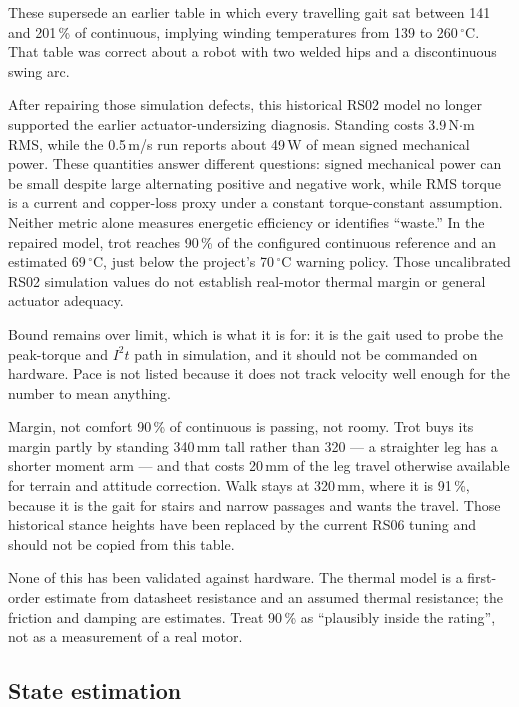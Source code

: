 \documentclass[11pt,a4paper]{article}
\begin{document}
These supersede an earlier table in which every travelling gait sat between 141
and 201\,\% of continuous, implying winding temperatures from 139 to
260\,$^\circ$C. That table was correct about a robot with two welded hips and a
discontinuous swing arc.

After repairing those simulation defects, this historical RS02 model no longer
supported the earlier actuator-undersizing diagnosis. Standing costs
3.9\,N$\cdot$m RMS, while the 0.5\,m/s run reports about 49\,W of mean signed
mechanical power. These quantities answer different questions: signed
mechanical power can be small despite large alternating positive and negative
work, while RMS torque is a current and copper-loss proxy under a constant
torque-constant assumption. Neither metric alone measures energetic efficiency
or identifies ``waste.'' In the repaired model, trot reaches 90\,\% of the configured continuous
reference and an estimated 69\,$^\circ$C, just below the project's
70\,$^\circ$C warning policy. Those uncalibrated RS02 simulation values do not
establish real-motor thermal margin or general actuator adequacy.

Bound remains over limit, which is what it is for: it is the gait used to probe
the peak-torque and $I^2t$ path in simulation, and it should not be commanded on
hardware. Pace is not listed because it does not track velocity well enough for
the number to mean anything.

\begin{caveat}{Margin, not comfort}
90\,\% of continuous is passing, not roomy. Trot buys its margin partly by
standing 340\,mm tall rather than 320 --- a straighter leg has a shorter moment
arm --- and that costs 20\,mm of the leg travel otherwise available for terrain
and attitude correction. Walk stays at 320\,mm, where it is 91\,\%,
because it is the gait for stairs and narrow passages and wants the travel.
Those historical stance heights have been replaced by the current RS06
tuning and should not be copied from this table.

None of this has been validated against hardware. The thermal model is a
first-order estimate from datasheet resistance and an assumed thermal
resistance; the friction and damping are estimates. Treat 90\,\% as
``plausibly inside the rating'', not as a measurement of a real motor.
\end{caveat}

\subsection{State estimation}
\end{document}

